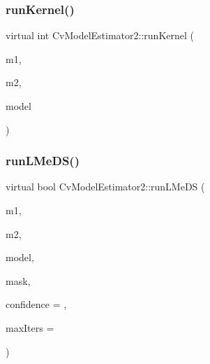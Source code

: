 \mbox{\label{class_cv_model_estimator2_ac8c9c1586d3334f468d4152c67554adc}} 
\subsubsection{run\+Kernel()}
{\footnotesize\ttfamily virtual int Cv\+Model\+Estimator2\+::run\+Kernel (\begin{DoxyParamCaption}\item[{const Cv\+Mat $\ast$}]{m1,  }\item[{const Cv\+Mat $\ast$}]{m2,  }\item[{Cv\+Mat $\ast$}]{model }\end{DoxyParamCaption})\hspace{0.3cm}{\ttfamily [pure virtual]}}

\mbox{\label{class_cv_model_estimator2_a15486b3aea44ad7247924dd1532ce5a8}} 
\subsubsection{run\+L\+Me\+D\+S()}
{\footnotesize\ttfamily virtual bool Cv\+Model\+Estimator2\+::run\+L\+Me\+DS (\begin{DoxyParamCaption}\item[{const Cv\+Mat $\ast$}]{m1,  }\item[{const Cv\+Mat $\ast$}]{m2,  }\item[{Cv\+Mat $\ast$}]{model,  }\item[{Cv\+Mat $\ast$}]{mask,  }\item[{double}]{confidence = {},  }\item[{int}]{max\+Iters = {} }\end{DoxyParamCaption})\hspace{0.3cm}{\ttfamily [virtual]}}

\mbox{\label{class_cv_model_estimator2_af44a8168c5416e210819c7eea380ac66}} 
